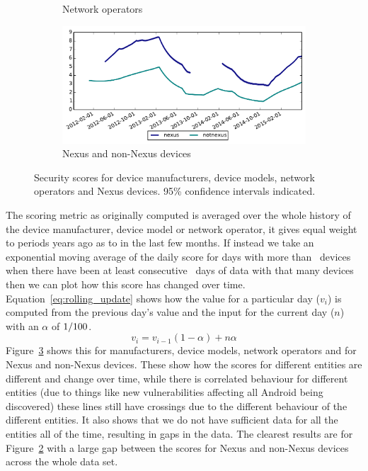 \begin{figure}
\begin{subfigure}{\columnwidth}
\caption{Network operators}
\label{fig:security_score_operator}
\end{subfigure}
%
\begin{subfigure}{\columnwidth}
\includegraphics[width=\columnwidth]{figures/security_score_summary}
\caption{Nexus and non-Nexus devices}
\label{fig:security_score_summary}
\end{subfigure}
\caption{Security scores for device manufacturers, device models, network operators and Nexus devices. 95\% confidence intervals indicated.}
\label{fig:security_scores}
\end{figure}
The scoring metric as originally computed is averaged over the whole history of the device manufacturer, device model or network operator, it gives equal weight to periods years ago as to in the last few months.
If instead we take an exponential moving average of the daily score for days with more than \daSigNumDevicesDay\ devices when there have been at least consecutive \daSigNumDays\ days of data with that many devices then we can plot how this score has changed over time.
Equation~\ref{eq:rolling_update} shows how the value for a particular day ($v_i$) is computed from the previous day's value and the input for the current day ($n$) with an $\alpha$ of $1/100$.
\begin{equation}
v_i = v_{i-1} (1 - \alpha) + n \alpha
\label{eq:rolling_update}
\end{equation}
Figure~\ref{fig:security_scores} shows this for manufacturers, device models, network operators and for Nexus and non-Nexus devices.
These show how the scores for different entities are different and change over time, while there is correlated behaviour for different entities (due to things like new vulnerabilities affecting all Android being discovered) these lines still have crossings due to the different behaviour of the different entities.
It also shows that we do not have sufficient data for all the entities all of the time, resulting in gaps in the data.
The clearest results are for Figure~\ref{fig:security_score_summary} with a large gap between the scores for Nexus and non-Nexus devices across the whole data set.


